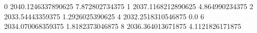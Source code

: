 0 2040.1246337890625 7.872802734375
1 2037.1168212890625 4.864990234375
2 2033.54443359375 1.2926025390625
4 2032.2518310546875 0.0
6 2034.070068359375 1.8182373046875
8 2036.364013671875 4.1121826171875
